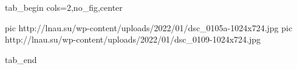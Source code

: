  
 
 
 
 


\ifcmt
  tab_begin cols=2,no_fig,center

     pic http://lnau.su/wp-content/uploads/2022/01/dsc_0105a-1024x724.jpg
		 pic http://lnau.su/wp-content/uploads/2022/01/dsc_0109-1024x724.jpg

  tab_end
\fi
